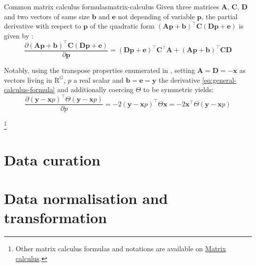 \begin{Property}{Common matrix calculus formulas}{matrix-calculus}
Given three matrices $\boldsymbol{A}$, $\boldsymbol{C}$, $\boldsymbol{D}$ and two vectors of same size $\boldsymbol{b}$ and $\boldsymbol{e}$ not depending of variable $\boldsymbol{p}$, the partial derivative with respect to $\boldsymbol{p}$ of the quadratic form $(\boldsymbol{A} \boldsymbol{p} + \boldsymbol{b})^\top \boldsymbol{C} (\boldsymbol{D} \boldsymbol{p} + \boldsymbol{e})$ is given by :
\begin{equation}
\label{eq:general-calculus-formula}
    \frac{\partial (\boldsymbol{A} \boldsymbol{p} + \boldsymbol{b})^\top \boldsymbol{C} (\boldsymbol{D} \boldsymbol{p} + \boldsymbol{e})}{\partial \boldsymbol{p}} = (\boldsymbol{D} \boldsymbol{p} + \boldsymbol{e})^\top \boldsymbol{C}^\top \boldsymbol{A} + (\boldsymbol{A} \boldsymbol{p} + \boldsymbol{b})^\top \boldsymbol{C} \boldsymbol{D}
\end{equation}

Notably, using the transpose properties enumerated in , setting $\boldsymbol{A} = \boldsymbol{D} = - \boldsymbol{x}$ as vectors living in $\mathrm{R}^G$, $p$ a real scalar and $\boldsymbol{b} = \boldsymbol{e} = \boldsymbol{y}$ the derivative \cref{eq:general-calculus-formula} and additionally coercing $\Theta$ to be symmetric yields:
\begin{equation*}
\label{eq:general-calculus-formula-easy}
    \frac{\partial (\boldsymbol{y} - \boldsymbol{x} p)^\top \Theta (\boldsymbol{y} - \boldsymbol{x} p)}{\partial p} = -2  (\boldsymbol{y} - \boldsymbol{x} p)^\top \Theta \boldsymbol{x} = -2 \boldsymbol{x}^\top \Theta (\boldsymbol{y} - \boldsymbol{x} p)
\end{equation*}

\footnote{Other matrix calculus formulas and notations are available on \href{https://en.wikipedia.org/wiki/Matrix_calculus\#Scalar-by-vector}{Matrix calculus}.}
\end{Property}

\section{Data curation}

\section{Data normalisation and transformation}

